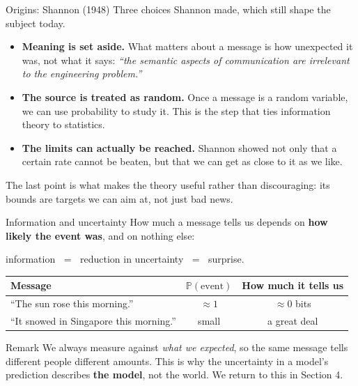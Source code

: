 \documentclass[aspectratio=169,9pt]{beamer}
\newcommand{\orange}[1]{\textcolor{AmazonOrange}{\textbf{#1}}}
\newcommand{\blue}[1]{\textcolor{densityblue}{\textbf{#1}}}
\newcommand{\muted}[1]{\textcolor{EPICMuted}{#1}}
\newcommand{\Prob}{\mathbb{P}}
\begin{document}
\begin{frame}{Origins: Shannon (1948)}
Three choices Shannon made, which still shape the subject today.
\begin{itemize}
    \item \orange{Meaning is set aside.} What matters about a message is how unexpected it was, not what it says:
    \textit{``the semantic aspects of communication are irrelevant to the engineering problem.''}
    \pause
    \item \orange{The source is treated as random.} Once a message is a random variable, we can use probability
    to study it. This is the step that ties information theory to statistics.
    \pause
    \item \orange{The limits can actually be reached.} Shannon showed not only that a certain rate cannot be
    beaten, but that we can get as close to it as we like.
\end{itemize}
\vspace{0.3cm}
\pause
\muted{The last point is what makes the theory useful rather than discouraging: its bounds are targets we can
aim at, not just bad news.}
\end{frame}

\begin{frame}{Information and uncertainty}
How much a message tells us depends on \blue{how likely the event was}, and on nothing else:
\begin{center}
\large information $\;=\;$ reduction in uncertainty $\;=\;$ surprise.
\end{center}
\vspace{0.1cm}
\pause
\begin{center}
\footnotesize
\begin{tabular}{lcc}
\toprule
\textbf{Message} & $\Prob(\text{event})$ & \textbf{How much it tells us} \\
\midrule
``The sun rose this morning.'' & $\approx 1$ & $\approx 0$ bits \\
``It snowed in Singapore this morning.'' & small & a great deal \\
\bottomrule
\end{tabular}
\end{center}
\vspace{0.3cm}
\pause
\begin{block}{Remark}
We always measure against \textit{what we expected}, so the same message tells different people different
amounts. This is why the uncertainty in a model's prediction describes \blue{the model}, not the world.
We return to this in Section 4.
\end{block}
\end{frame}
\end{document}
